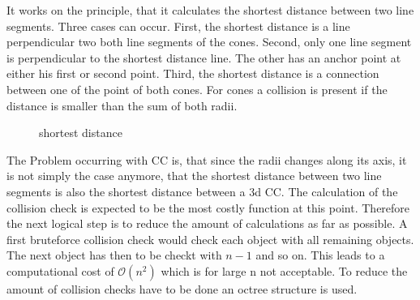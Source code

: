 % 
It works on the principle, that it calculates the shortest distance between two line segments.
Three cases can occur.
First, the shortest distance is a line perpendicular two both line segments of the cones.
Second, only one line segment is perpendicular to the shortest distance line.
The other has an anchor point at either his first or second point.
Third, the shortest distance is a connection between one of the point of both cones.
For cones a collision is present if the distance is smaller than the sum of both radii.
\\
\begin{figure}[!t]
    \centering
    \def\tikzheight{0.5\textwidth}
	\caption{shortest distance}
	\label{fig:shortDist}
\end{figure}
% 
The Problem occurring with \ac{CC} is, that since the radii changes along its axis, it is not simply the case anymore, that the shortest distance between two line segments is also the shortest distance between a 3d \ac{CC}.
% 
The calculation of the collision check is expected to be the most costly function at this point.
Therefore the next logical step is to reduce the amount of calculations as far as possible.
A first bruteforce collision check would check each object with all remaining objects.
The next object has then to be checkt with $n-1$ and so on.
This leads to a computational cost of $\mathcal{O}(n^{2})$ which is for large n not acceptable.
To reduce the amount of collision checks have to be done an octree structure is used.
% 
